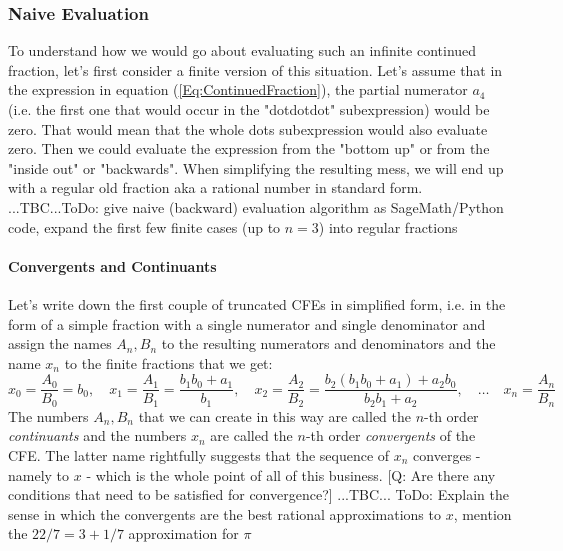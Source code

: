 \subsubsection{Naive Evaluation}
To understand how we would go about evaluating such an infinite continued fraction, let's first consider a finite version of this situation. Let's assume that in the expression in equation (\ref{Eq:ContinuedFraction}), the partial numerator $a_4$ (i.e. the first one that would occur in the "dotdotdot" subexpression) would be zero. That would mean that the whole dots subexpression would also evaluate zero. Then we could evaluate the expression from the "bottom up" or from the "inside out" or "backwards". When simplifying the resulting mess, we will end up with a regular old fraction aka a rational number in standard form. ...TBC...ToDo: give naive (backward) evaluation algorithm as SageMath/Python code, expand the first few finite cases (up to $n=3$) into regular fractions




\paragraph{Convergents and Continuants}
Let's write down the first couple of truncated CFEs in simplified form, i.e. in the form of a simple fraction with a single numerator and single denominator and assign the names $A_n, B_n$ to the resulting numerators and denominators and the name $x_n$ to the finite fractions that we get:
\begin{equation}
\label{Eq:ContinuantsAndConvergents}
x_0 = \frac{A_0}{B_0} = b_0, \quad
x_1 = \frac{A_1}{B_1} = \frac{b_1 b_0 + a_1}{b_1}, \quad
x_2 = \frac{A_2}{B_2} = \frac{b_2(b_1 b_0 + a_1) + a_2 b_0}{b_2 b_1 + a_2}, \quad
\ldots \quad
x_n = \frac{A_n}{B_n}
\end{equation}
The numbers $A_n, B_n$ that we can create in this way are called the $n$-th order \emph{continuants} and the numbers $x_n$ are called the $n$-th order \emph{convergents} of the CFE. The latter name rightfully suggests that the sequence of $x_n$ converges - namely to $x$ - which is the whole point of all of this business. [Q: Are there any conditions that need to be satisfied for convergence?] ...TBC... ToDo: Explain the sense in which the convergents are the best rational approximations to $x$, mention the $22/7 = 3 + 
1/7$ approximation for $\pi$

